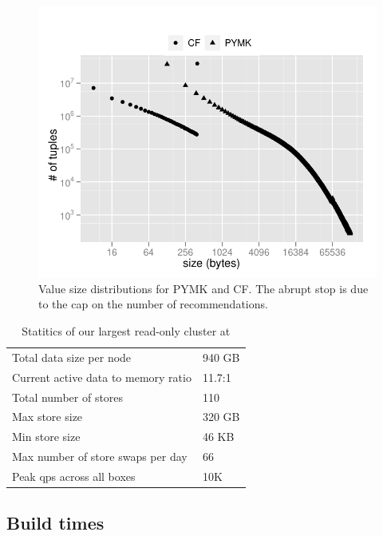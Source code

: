 \begin{figure}
  \centering
    \includegraphics[scale=0.55]{images/data_distribution.pdf}
  \caption{Value size distributions for PYMK and CF. The abrupt stop
is due to the cap on the number of recommendations.}
  \label{distribution}
\end{figure}

\begin{table}
\begin{center}
	\begin{tabular} { | l | l | }
	\hline
	Total data size per node &	940 GB			\\ 
	Current active data to memory ratio &	11.7:1		\\
	\hline
	Total number of stores &	110 	\\
	Max store size  &		320 GB	\\
	Min store size &		46 KB	\\
	Max number of store swaps per day & 66	\\
	\hline
	Peak qps across all boxes & 	10K \\
	\hline
	\end{tabular}
\end{center}
	\caption{Statitics of our largest read-only cluster at \linkedin{}}
 	\label{tab:production_statistics}
\end{table}

\subsection{Build times}

